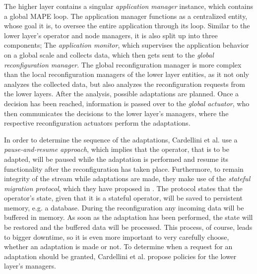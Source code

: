         \quad The higher layer contains a singular \textit{application manager} instance, which contains a global MAPE loop.
        The application manager functions as a centralized entity, whose goal it is, to oversee the entire application through its loop.
        Similar to the lower layer's operator and node managers, it is also split up into three components;
        The \textit{application monitor}, which supervises the application behavior on a global scale and collects data, which then gets sent to the \textit{global reconfiguration manager}.
        The global reconfiguration manager is more complex than the local reconfiguration managers of the lower layer entities, as it not only analyzes the collected data, but 
        also analyzes the reconfiguration requests from the lower layers. After the analysis, possible adaptations are planned.
        Once a decision has been reached, information is passed over to the \textit{global actuator}, who then communicates the decisions to the lower layer's managers, 
        where the respective reconfiguration actuators perform the adaptations.
        
        \quad In order to determine the sequence of the adaptations, Cardellini et al. use a \textit{pause-and-resume approach}\cite{Heinze2014CloudbasedDS}, 
        which implies that the operator, that is to be adapted, will be paused while the adaptation is performed and resume its functionality after the 
        reconfiguration has taken place. 
        Furthermore, to remain integrity of the stream while adaptations are made, they make use of the \textit{stateful migration protocol}, 
        which they have proposed in \cite{migrationProtocol}. The protocol states that the operator's state, given that it is a stateful operator, 
        will be saved to persistent memory, e.g. a database. During the reconfiguration any incoming data will be buffered in memory.
        As soon as the adaptation has been performed, the state will be restored and the buffered data will be processed.
        This process, of course, leads to bigger downtime, so it is even more important to very carefully choose, whether an adaptation is made or not.
        To determine when a request for an adaptation should be granted, Cardellini et al. propose policies for the lower layer's managers.

